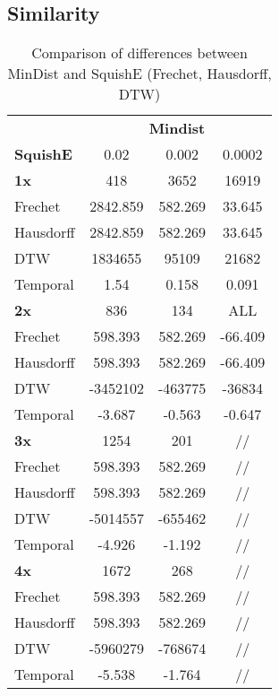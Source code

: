 \subsection{Similarity}
\begin{table}[htbp]
	\centering
	\label{tab:mindist_vs_squish_comparison}
	\begin{tabular}{@{}lccc@{}}
		\toprule
		& \multicolumn{3}{c}{\textbf{Mindist}} \\
		\cmidrule(l){2-4}
		\textbf{SquishE} & 0.02 & 0.002 & 0.0002 \\
		\midrule
		\textbf{1x} 	& 418 	& 3652 & 16919 \\
		Frechet 		& 2842.859 & 582.269 & 33.645 \\
		Hausdorff 		& 2842.859 	& 582.269 & 33.645 \\
		DTW 			& 1834655 	& 95109 & 21682 \\
		Temporal 		& 1.54 	& 0.158 & 0.091 \\ \midrule
		\textbf{2x} 	& 836 & 134 & ALL \\
		Frechet 		& 598.393 & 582.269 & -66.409 \\
		Hausdorff 		& 598.393 & 582.269 & -66.409 \\
		DTW  		& -3452102 & -463775 & -36834 \\
		Temporal 	& -3.687 & -0.563 & -0.647 \\ \midrule
		\textbf{3x} 	& 1254 & 201 & // \\
		Frechet 		& 598.393 & 582.269 &  // \\
		Hausdorff 		& 598.393 & 582.269 &  // \\
		DTW 		& -5014557 & -655462 &  // \\
		Temporal 			& -4.926 & -1.192 & // \\ \midrule
		\textbf{4x} 	& 1672 & 268 &  // \\
		Frechet 		& 598.393 & 582.269 &  // \\
		Hausdorff 		& 598.393 & 582.269 &  // \\
		DTW 		& -5960279 & -768674 &  // \\
		Temporal 			& -5.538 & -1.764 &  // \\
		\bottomrule
	\end{tabular}
	\caption{Comparison of differences between MinDist and SquishE (Frechet, Hausdorff, DTW)}
\end{table}


